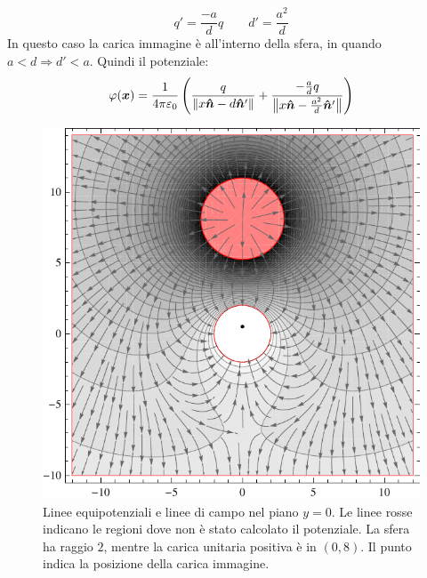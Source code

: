 \begin{Es}
  \[
    q'=\frac{-a}{d}q\qquad d'=\frac{a^2}{d}
  \]
  In questo caso la carica immagine è all'interno della sfera, in quando $a < d\Rightarrow d'<a$. Quindi il potenziale:
  \[
    \varphi(\boldsymbol{x}) = \frac{1}{4\pi\varepsilon_0}\left(\frac{q}{\left\lVert x\boldsymbol{\hat {n}} -d\boldsymbol{\hat {n}}'\right\rVert}+\frac{-\frac{a}{d}q}{\left\lVert x\boldsymbol{\hat {n}}-\frac{a^2}{d}\boldsymbol{\hat {n}}'\right\rVert}\right)
  \]
  \begin{figure}[htbp]
    \centering
    \includegraphics{immagini/fisica2/sfera_neutra}
    \caption{Linee equipotenziali e linee di campo nel piano $y=0$. Le linee rosse indicano le regioni dove non è stato calcolato il potenziale. La sfera ha raggio $2$, mentre la carica unitaria positiva è in $(0,8)$. Il punto indica la posizione della carica immagine.}
  \end{figure}
\end{Es}

